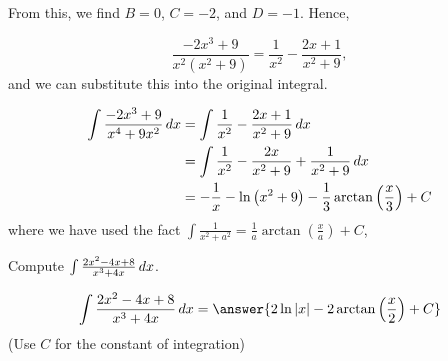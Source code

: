 \documentclass{ximera}
\begin{document}
\begin{exercise}
\begin{example}
From this, we find $B=0$, $C=-2$, and $D=-1$.  Hence,

\[
\frac{-2x^3+9}{x^2(x^2+9)} = \frac{1}{x^2}-\frac{2x+1}{x^2+9},
\]
and we can substitute this into the original integral.

\begin{align*}
\int \frac{-2x^3+9}{x^4+9x^2} \mathop{}\!d x &=  \int \frac{1}{x^2}-\frac{2x+1}{x^2+9} \mathop{}\!d x \\
&=  \int \frac{1}{x^2}-\frac{2x}{x^2+9} +\frac{1}{x^2+9} \mathop{}\!d x \\
&=  -\frac{1}{x}-\ln\left(x^2+9\right) -\frac{1}{3} \arctan\left(\frac{x}{3}\right) +C \\
\end{align*}
where we have used the fact $\int \frac{1}{x^2+a^2} = \frac{1}{a} \arctan\left(\frac{x}{a}\right)+C$, 

\end{example}

Compute $\int \frac{2x^2-4x+8}{x^3+4x} \mathop{}\!d x$.

\[
\int \frac{2x^2-4x+8}{x^3+4x} \d x = \answer{2 \ln|x|-2\arctan\left(\frac{x}{2}\right)+C}
\]
(Use $C$ for the constant of integration)
\end{exercise}
\end{document}

